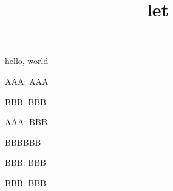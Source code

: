 \documentclass{amsart}
\title{let}
\def\A{AAA}
\def\B{BBB}
\begin{document}
\maketitle

hello, world

\let\X\A

AAA: \X

\begingroup

\let\X\B

BBB: \X

\endgroup

AAA: \X

\begingroup

\glet\X\B

BBB: \X

\endgroup

BBB: \X
\end{document}
